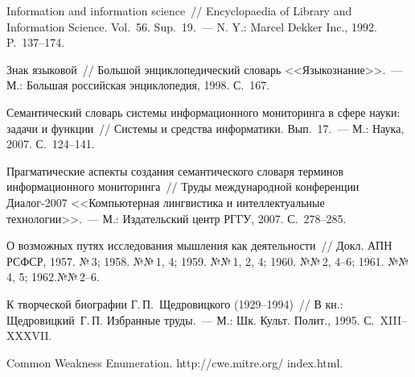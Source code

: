 \begin{multicols}{2}
{{\begin{thebibliography}{99}
Information and information science~// Encyclopaedia of Library and Information Science.
Vol.~56. Sup.~19.~--- N. Y.: Marcel Dekker Inc., 1992.  P.~137--174.

Знак языковой~// Большой энциклопедический словарь <<Языкознание>>.~--- М.: Большая
российская энциклопедия, 1998.  С.~167.

Семантический словарь системы информационного мониторинга в сфере науки: задачи и
функции~// Системы и средства информатики. Вып.~17.~--- М.: Наука, 2007.  С.~124--141.

Прагматические аспекты создания семантического словаря терминов информационного
мониторинга~// Труды международной конференции Диалог-2007 <<Компьютерная\linebreak
лингвистика и интеллектуальные технологии>>.~--- М.: Издательский центр РГГУ, 2007.
С.~278--285.


О возможных путях исследования мышления как деятельности~// Докл. АПН РСФСР, 1957.
№\,3; 1958. №№\,1, 4; 1959. №№\,1, 2, 4; 1960. №№\,2, 4--6; 1961. №№\,4, 5; 1962.\linebreak №№\,2--6.


К творческой биографии Г.\,П.~Щед\-ро\-виц\-ко\-го (1929--1994)~// В кн.: Щедровицкий~Г.\,П.
Избранные труды.~--- М.: Шк. Культ. Полит., 1995. С.~XIII--XXXVII.

\label{end\stat}

Common Weakness Enumeration.  {\sf http://cwe.mitre.org/} {\sf index.html}.
\end{thebibliography}
}
}
\end{multicols}